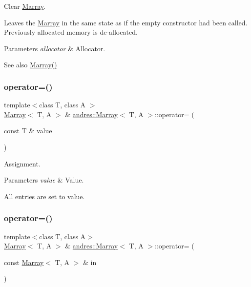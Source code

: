 Clear \hyperlink{classandres_1_1Marray}{Marray}.

Leaves the \hyperlink{classandres_1_1Marray}{Marray} in the same state as if the empty constructor had been called. Previously allocated memory is de-\/allocated.


\begin{DoxyParams}{Parameters}
{\em allocator} & Allocator. \\
\hline
\end{DoxyParams}
\begin{DoxySeeAlso}{See also}
\hyperlink{classandres_1_1Marray_ae04d0a668897b7c72eb548c303804254}{Marray()} 
\end{DoxySeeAlso}
\mbox{\label{classandres_1_1Marray_a18534988db521fe763e84eef0b3e6c8c}} 
\subsubsection{\texorpdfstring{operator=()}{operator=()}\hspace{0.1cm}{\footnotesize\ttfamily [1/4]}}
{\footnotesize\ttfamily template$<$class T, class A $>$ \\
\hyperlink{classandres_1_1Marray}{Marray}$<$ T, A $>$ \& \hyperlink{classandres_1_1Marray}{andres\+::\+Marray}$<$ T, A $>$\+::operator= (\begin{DoxyParamCaption}\item[{const T \&}]{value }\end{DoxyParamCaption})\hspace{0.3cm}{\ttfamily [inline]}}

Assignment.


\begin{DoxyParams}{Parameters}
{\em value} & Value.\\
\hline
\end{DoxyParams}
All entries are set to value. \mbox{\label{classandres_1_1Marray_a7519023d16efb739c0248a84c006e9e6}} 
\subsubsection{\texorpdfstring{operator=()}{operator=()}\hspace{0.1cm}{\footnotesize\ttfamily [2/4]}}
{\footnotesize\ttfamily template$<$class T, class A$>$ \\
\hyperlink{classandres_1_1Marray}{Marray}$<$ T, A $>$ \& \hyperlink{classandres_1_1Marray}{andres\+::\+Marray}$<$ T, A $>$\+::operator= (\begin{DoxyParamCaption}\item[{const \hyperlink{classandres_1_1Marray}{Marray}$<$ T, A $>$ \&}]{in }\end{DoxyParamCaption})}

